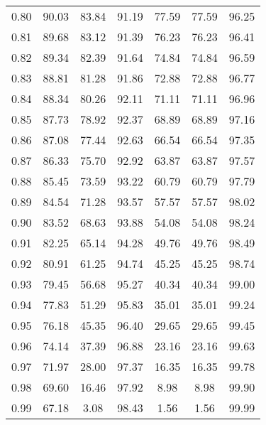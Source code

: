 \begin{tabular}{|c|c|c|c|c|c|c|}
      0.80 &     90.03 &     83.84 &      91.19 &   77.59 &      77.59 &         96.25 \\
      0.81 &     89.68 &     83.12 &      91.39 &   76.23 &      76.23 &         96.41 \\
      0.82 &     89.34 &     82.39 &      91.64 &   74.84 &      74.84 &         96.59 \\
      0.83 &     88.81 &     81.28 &      91.86 &   72.88 &      72.88 &         96.77 \\
      0.84 &     88.34 &     80.26 &      92.11 &   71.11 &      71.11 &         96.96 \\
      0.85 &     87.73 &     78.92 &      92.37 &   68.89 &      68.89 &         97.16 \\
      0.86 &     87.08 &     77.44 &      92.63 &   66.54 &      66.54 &         97.35 \\
      0.87 &     86.33 &     75.70 &      92.92 &   63.87 &      63.87 &         97.57 \\
      0.88 &     85.45 &     73.59 &      93.22 &   60.79 &      60.79 &         97.79 \\
      0.89 &     84.54 &     71.28 &      93.57 &   57.57 &      57.57 &         98.02 \\
      0.90 &     83.52 &     68.63 &      93.88 &   54.08 &      54.08 &         98.24 \\
      0.91 &     82.25 &     65.14 &      94.28 &   49.76 &      49.76 &         98.49 \\
      0.92 &     80.91 &     61.25 &      94.74 &   45.25 &      45.25 &         98.74 \\
      0.93 &     79.45 &     56.68 &      95.27 &   40.34 &      40.34 &         99.00 \\
      0.94 &     77.83 &     51.29 &      95.83 &   35.01 &      35.01 &         99.24 \\
      0.95 &     76.18 &     45.35 &      96.40 &   29.65 &      29.65 &         99.45 \\
      0.96 &     74.14 &     37.39 &      96.88 &   23.16 &      23.16 &         99.63 \\
      0.97 &     71.97 &     28.00 &      97.37 &   16.35 &      16.35 &         99.78 \\
      0.98 &     69.60 &     16.46 &      97.92 &    8.98 &       8.98 &         99.90 \\
      0.99 &     67.18 &      3.08 &      98.43 &    1.56 &       1.56 &         99.99 \\
\bottomrule
\end{tabular}
